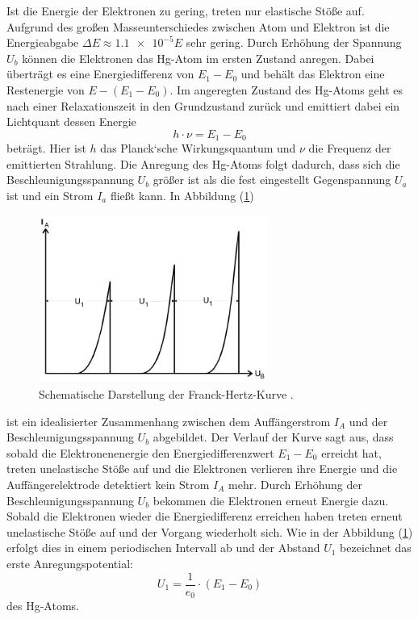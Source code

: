 Ist die Energie der Elektronen zu gering, treten nur elastische Stöße auf. Aufgrund des großen
Masseunterschiedes zwischen Atom und Elektron ist die Energieabgabe $\Delta E \approx \num{1.1 e-5} E$
sehr gering.
Durch Erhöhung der Spannung $U_b$ können die Elektronen das Hg-Atom im ersten Zustand anregen.
Dabei überträgt es eine Energiedifferenz von $E_1 - E_0$ und behält das Elektron eine Restenergie von  $E -(E_1 -E_0)$.
Im angeregten Zustand des Hg-Atoms geht es nach einer Relaxationszeit in den Grundzustand zurück und
emittiert dabei ein Lichtquant dessen Energie
\begin{equation}
  h \cdot \nu = E_1 -E_0
\label{eq:3}
\end{equation}
beträgt.
Hier ist $h$ das Planck‘sche Wirkungsquantum und $\nu$ die Frequenz der emittierten Strahlung.
Die Anregung des Hg-Atoms folgt dadurch, dass sich die Beschleunigungsspannung $U_b$ größer ist als die
fest eingestellt Gegenspannung $U_a$ ist und ein Strom $I_a$ fließt kann.
In Abbildung (\ref{abb:2})
\begin{figure}[H]
\centering
\includegraphics[width =7 cm, height = 5.5cm]{content/Verlauf.jpg}
\caption{Schematische Darstellung der Franck-Hertz-Kurve \cite{1}.}
\label{abb:2}
\end{figure}
ist ein idealisierter Zusammenhang zwischen dem Auffängerstrom $I_A$ und
der Beschleunigungsspannung $U_b$ abgebildet.
Der Verlauf der Kurve sagt aus, dass sobald die Elektronenenergie den Energiedifferenzwert $E_1 - E_0$ erreicht hat, treten
unelastische Stöße auf und die Elektronen verlieren ihre Energie und die Auffängerelektrode detektiert kein Strom $I_A$ mehr.
Durch Erhöhung der Beschleunigungsspannung $U_b$ bekommen die Elektronen erneut Energie dazu.
Sobald die Elektronen wieder die Energiedifferenz erreichen haben treten erneut unelastische Stöße auf und der Vorgang wiederholt sich.
Wie in der Abbildung (\ref{abb:2}) erfolgt dies in einem periodischen Intervall ab und
der Abstand $U_1$ bezeichnet das erste Anregungspotential:
\begin{equation}
  U_1 = \frac{1}{e_0} \cdot (E_1 - E_0)
  \label{eq:4}
\end{equation}
des Hg-Atoms.
